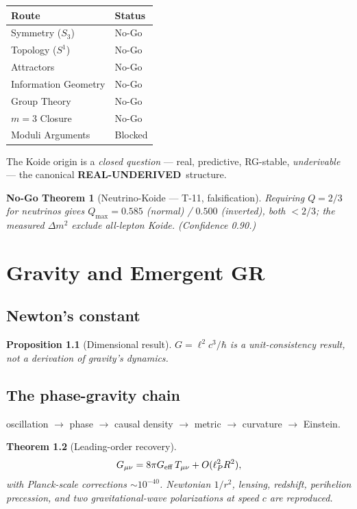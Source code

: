 \documentclass[11pt,twoside]{book}
\newtheorem{theorem}{Theorem}[chapter]
\newtheorem{proposition}[theorem]{Proposition}
\newtheorem{nogo}[theorem]{No-Go Theorem}
\newcommand{\realunder}{\textbf{REAL-UNDERIVED}}
\begin{document}
\begin{center}
\begin{tabular}{ll}
\toprule
Route & Status \\
\midrule
Symmetry ($S_3$) & No-Go \\
Topology ($S^1$) & No-Go \\
Attractors & No-Go \\
Information Geometry & No-Go \\
Group Theory & No-Go \\
$m=3$ Closure & No-Go \\
Moduli Arguments & Blocked \\
\bottomrule
\end{tabular}
\end{center}

The Koide origin is a \emph{closed question} — real, predictive, RG-stable,
\emph{underivable} — the canonical \realunder\ structure.

\begin{nogo}[Neutrino-Koide — T-11, falsification]
Requiring $Q=2/3$ for neutrinos gives $Q_{\max}=0.585$ (normal) / $0.500$ (inverted), both
$<2/3$; the measured $\Delta m^2$ exclude all-lepton Koide. (Confidence 0.90.)
\end{nogo}


\chapter{Gravity and Emergent GR}
\label{ch:gravity}

\section{Newton's constant}

\begin{proposition}[Dimensional result]
$G = \ell^2 c^3/\hbar$ is a \emph{unit-consistency} result, not a derivation of gravity's
dynamics.
\end{proposition}

\section{The phase-gravity chain}

oscillation $\to$ phase $\to$ causal density $\to$ metric $\to$ curvature $\to$ Einstein.

\begin{theorem}[Leading-order recovery]
\begin{equation}
G_{\mu\nu} = 8\pi G_{\rm eff}\, T_{\mu\nu} + O(\ell_P^2 R^2),
\end{equation}
with Planck-scale corrections $\sim10^{-40}$. Newtonian $1/r^2$, lensing, redshift,
perihelion precession, and two gravitational-wave polarizations at speed $c$ are reproduced.
\end{theorem}
\end{document}
